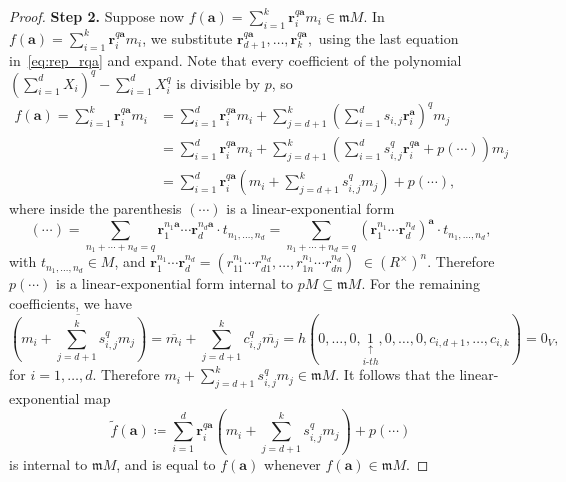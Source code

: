 \documentclass[letterpaper, 11pt, thm-restate]{article}
\numberwithin{equation}{section}
\newcommand{\ba}{\boldsymbol{a}}
\newcommand{\br}{\boldsymbol{r}}
\newcommand{\frm}{\mathfrak{m}}
\theoremstyle{definition}
\theoremstyle{definition}
\theoremstyle{definition}
\begin{document}
\begin{proof}
    \textbf{Step 2.}
    Suppose now $f(\ba)=\sum_{i=1}^k \br_i^{q\ba}m_i \in \frm M$.
    In $f(\ba)=\sum_{i=1}^k\br_i^{q\ba}m_i$, we substitute $\br_{d+1}^{q\ba}, \ldots, \br_{k}^{q\ba},$ using the last equation in~\eqref{eq:rep_rqa} and expand.
    Note that every coefficient of the polynomial $(\sum_{i=1}^d X_i)^q - \sum_{i=1}^d X_i^q$ is divisible by $p$, so
    \begin{align*}
        f(\ba) =\sum_{i=1}^k\br_i^{q\ba}m_i & = \sum_{i=1}^d\br_i^{q\ba}m_i + \sum_{j=d+1}^k \left( \sum_{i = 1}^d s_{i,j}\br_i^{\ba} \right)^q m_{j}\\
        & = \sum_{i=1}^d\br_i^{q\ba}m_i + \sum_{j=d+1}^k \left(\sum_{i = 1}^d s_{i,j}^q\br_i^{q\ba} + p(\cdots)\right)m_{j} \\
        & = \sum_{i=1}^d \br_i^{q\ba} \left(m_i + \sum_{j = d+1}^k s_{i, j}^q m_j\right) + p(\cdots ),
    \end{align*}
    where inside the parenthesis $(\cdots)$ is a linear-exponential form 
    \[
    (\cdots) = \sum_{n_1 + \cdots + n_d = q} \br_1^{n_1\ba} \cdots \br_d^{n_d\ba} \cdot t_{n_1, \ldots, n_d} = \sum_{n_1 + \cdots + n_d = q} (\br_1^{n_1} \cdots \br_d^{n_d})^{\ba} \cdot t_{n_1, \ldots, n_d},
    \]
    with $t_{n_1, \ldots, n_d} \in M$, and $\br_1^{n_1} \cdots \br_d^{n_d} = (r_{11}^{n_1} \cdots r_{d1}^{n_d}, \ldots, r_{1n}^{n_1} \cdots r_{dn}^{n_d})$ $\in (R^{\times})^n$.
    Therefore $p(\cdots)$ is a linear-exponential form internal to $pM\subseteq\frm M$. 
    For the remaining coefficients, we have
    \[
    \overline{\left(m_i + \sum_{j = d+1}^k s_{i, j}^q m_j\right)} = \overline{m_i}+\sum_{j = d+1}^k c_{i,j}^q\overline{m_j} = h(0,\ldots,0,\underset{i\text{-}th}{\underset{\uparrow}{1}},0,\ldots,0,c_{i,d+1},\ldots,c_{i,k}) = 0_V,
    \]
    for $i = 1, \ldots, d$.
    Therefore $m_i + \sum_{j = d+1}^k s_{i, j}^q m_j \in \frm M$.
    It follows that the linear-exponential map
    \[
    \tilde{f}(\ba) \coloneqq \sum_{i=1}^d \br_i^{q\ba} \left(m_i + \sum_{j = d+1}^k s_{i, j}^q m_j\right) + p(\cdots )
    \]
    is internal to $\frm M$, and is equal to $f(\ba)$ whenever $f(\ba) \in \frm M$.
\end{proof}
\end{document}
